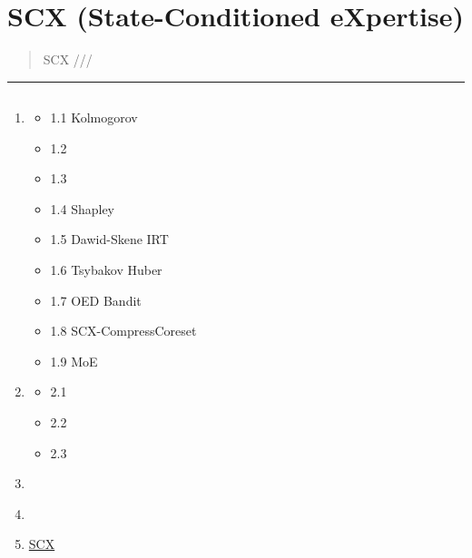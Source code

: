 \documentclass[
  12pt,
]{article}
\author{SCX}
\date{2026}
\providecommand{\tightlist}{%
  \setlength{\itemsep}{0pt}\setlength{\parskip}{0pt}}
\begin{document}
\section{SCX (State-Conditioned eXpertise)
}\label{scx-state-conditioned-expertise-ux6838ux5fc3ux6570ux5b66ux6846ux67b6ux6df1ux5ea6ux5206ux6790}

\begin{quote}
 SCX
///
\end{quote}

\begin{center}\rule{0.5\linewidth}{0.5pt}\end{center}

\subsection{}\label{ux76eeux5f55}

\begin{enumerate}
\def\labelenumi{\arabic{enumi}.}
\tightlist
\item
  \hyperref[1-ux6570ux5b66ux6839ux6e90ux8ffdux6eaf]{}

  \begin{itemize}
  \tightlist
  \item
    1.1  Kolmogorov 
  \item
    1.2 
  \item
    1.3 
  \item
    1.4 Shapley 
  \item
    1.5 Dawid-Skene  IRT
  \item
    1.6 Tsybakov  Huber
  \item
    1.7 OED Bandit
  \item
    1.8 SCX-CompressCoreset 
  \item
    1.9 MoE 
  \end{itemize}
\item
  \hyperref[2-ux4e09ux4e2aux547dux9898ux7684ux5b8cux6574ux8bc1ux660eux6846ux67b6]{}

  \begin{itemize}
  \tightlist
  \item
    2.1 
  \item
    2.2 
  \item
    2.3 
  \end{itemize}
\item
  \hyperref[3-ux72b6ux6001ux7a7aux95f4ux6784ux9020ux65b9ux6cd5]{}
\item
  \hyperref[4-ux5b50ux6a21ux5757ux6570ux636eux6d41ux4e0eux534fux8c03]{}
\item
  \hyperref[5-scx-ux7406ux8bbaux8fb9ux754c]{SCX }
\end{enumerate}
\end{document}
